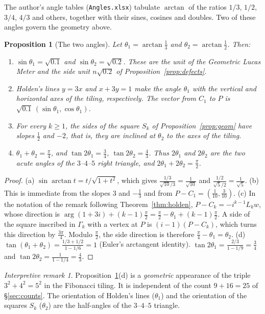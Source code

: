 \documentclass[11pt,a4paper]{article}
\theoremstyle{plain}
\newtheorem{proposition}[theorem]{Proposition}
\theoremstyle{definition}
\theoremstyle{remark}
\newtheorem*{interp}{Interpretive remark}
\begin{document}
The author's angle tables (\texttt{Angles.xlsx}) tabulate $\arctan$ of the ratios $1/3$, $1/2$, $3/4$, $4/3$ and others, together with their sines, cosines and doubles. Two of these angles govern the geometry above.

\begin{proposition}[The two angles]\label{prop:angles}
Let $\theta_1=\arctan\frac13$ and $\theta_2=\arctan\frac12$. Then:
\begin{enumerate}[label=(\alph*),itemsep=2pt]
  \item $\sin\theta_1=\sqrt{0.1}$ and $\sin\theta_2=\sqrt{0.2}$. These are the unit of the Geometric Lucas Meter and the side unit $n\sqrt{0.2}$ of Proposition~\ref{prop:defects}.
  \item Holden's lines $y=3x$ and $x+3y=1$ make the angle $\theta_1$ with the vertical and horizontal axes of the tiling, respectively. The vector from $C_1$ to $P$ is $\sqrt{0.1}\,(\sin\theta_1,\cos\theta_1)$.
  \item For every $k\ge1$, the sides of the square $S_k$ of Proposition~\ref{prop:geom} have slopes $\frac12$ and $-2$, that is, they are inclined at $\theta_2$ to the axes of the tiling.
  \item $\theta_1+\theta_2=\frac{\pi}{4}$, and $\tan2\theta_1=\frac34$, $\tan2\theta_2=\frac43$. Thus $2\theta_1$ and $2\theta_2$ are the two acute angles of the $3$–$4$–$5$ right triangle, and $2\theta_1+2\theta_2=\frac{\pi}{2}$.
\end{enumerate}
\end{proposition}

\begin{proof}
(a) $\sin\arctan t=t/\sqrt{1+t^{2}}$, which gives $\frac{1/3}{\sqrt{10}/3}=\frac1{\sqrt{10}}$ and $\frac{1/2}{\sqrt5/2}=\frac1{\sqrt5}$.
(b) This is immediate from the slopes $3$ and $-\frac13$ and from $P-C_1=(\frac1{10},\frac3{10})$.
(c) In the notation of the remark following Theorem~\ref{thm:holden}, $P-C_k=-i^{k-1}L_kw$, whose direction is $\arg(1+3i)+(k-1)\frac{\pi}{2}=\frac{\pi}{2}-\theta_1+(k-1)\frac{\pi}{2}$. A side of the square inscribed in $\Gamma_k$ with a vertex at $P$ is $(i-1)(P-C_k)$, which turns this direction by $\frac{3\pi}{4}$. Modulo $\frac{\pi}{2}$, the side direction is therefore $\frac{\pi}{4}-\theta_1=\theta_2$.
(d) $\tan(\theta_1+\theta_2)=\frac{1/3+1/2}{1-1/6}=1$ (Euler's arctangent identity). $\tan2\theta_1=\frac{2/3}{1-1/9}=\frac34$ and $\tan2\theta_2=\frac{1}{1-1/4}=\frac43$.
\end{proof}

\begin{interp}
Proposition~\ref{prop:angles}(d) is a \emph{geometric} appearance of the triple $3^{2}+4^{2}=5^{2}$ in the Fibonacci tiling. It is independent of the count $9+16=25$ of §\ref{sec:counts}. The orientation of Holden's lines ($\theta_1$) and the orientation of the squares $S_k$ ($\theta_2$) are the half-angles of the $3$–$4$–$5$ triangle.
\end{interp}
\end{document}
